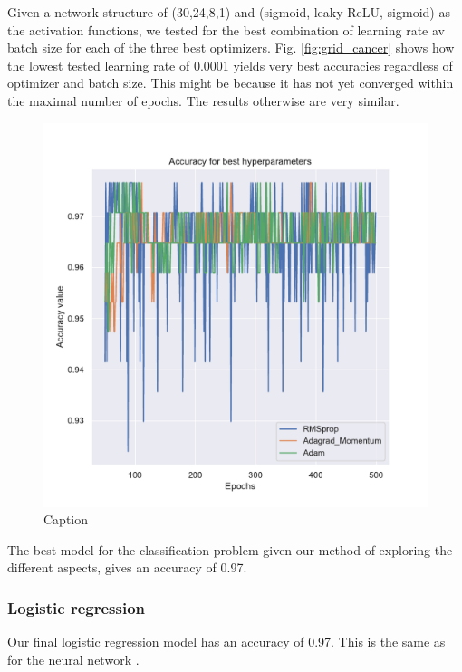 Given a network structure of (30,24,8,1) and (sigmoid, leaky ReLU, sigmoid) as the activation functions, we tested for the best combination of learning rate av batch size for each of the three best optimizers. Fig. \ref{fig:grid_cancer} shows how the lowest tested learning rate of 0.0001 yields very best accuracies regardless of optimizer and batch size. This might be because it has not yet converged within the maximal number of epochs. 
The results otherwise are very similar. 

\begin{figure}[h!]
    \centering
    \includegraphics[width=1.0\linewidth]{project_2/figures/best_classification.pdf}
    \caption{Caption}
    \label{fig:best_cancer}
\end{figure}

The best model for the classification problem given our method of exploring the different aspects, gives an accuracy of 0.97. 


\subsubsection{Logistic regression}

Our final logistic regression model has an accuracy of 0.97. This is the same as for the neural network .

